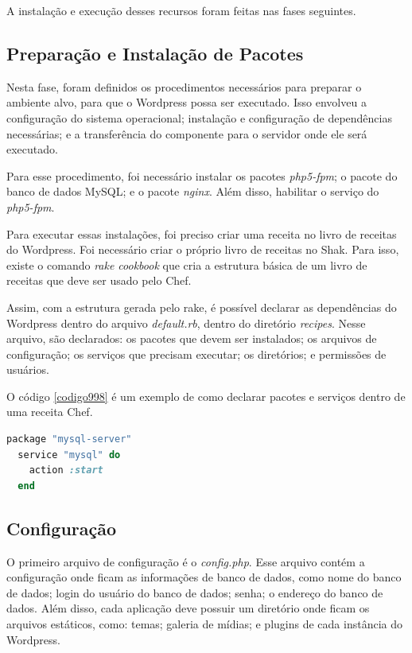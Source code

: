 A instalação e execução desses recursos foram feitas nas fases seguintes.

\subsection{Preparação e Instalação de Pacotes}
\label{wordpress:preparacao}

Nesta fase, foram definidos os procedimentos necessários para 
preparar o ambiente alvo, para que o Wordpress
possa ser executado. Isso envolveu a configuração do sistema operacional; instalação
e configuração de dependências necessárias; e a transferência do componente
para o servidor onde ele será executado.

Para esse procedimento, foi necessário instalar os pacotes \textit{php5-fpm}; o pacote
do banco de dados MySQL; e o pacote \textit{nginx}. Além disso, habilitar o serviço do
\textit{php5-fpm}.
 
Para executar essas instalações, foi preciso criar uma receita no livro de receitas
do Wordpress. Foi necessário criar o próprio livro de receitas no Shak.
Para isso, existe o comando \textit{rake cookbook} que cria a estrutura básica
de um livro de receitas que deve ser usado pelo Chef.

Assim, com a estrutura gerada pelo rake, é possível declarar as dependências do Wordpress
dentro do arquivo \textit{default.rb}, dentro do diretório \textit{recipes}. Nesse 
arquivo, são declarados: os pacotes que devem ser instalados; os arquivos de configuração;
os serviços que precisam executar; os diretórios; e permissões de usuários. 

O código \ref{codigo998} é um exemplo de como declarar pacotes e serviços dentro de uma receita Chef.

\begin{lstlisting}[basicstyle=\ttfamily, language=Ruby,label=dice_index,caption={Exemplo de criação de serviço do mysql com o chef}, label=codigo998]
  package "mysql-server"
  service "mysql" do
    action :start
  end
\end{lstlisting}

\subsection{Configuração}
\label{wordpress:preparacao}

O primeiro arquivo de configuração é o \textit{config.php}. Esse arquivo contém a
configuração onde ficam as informações de banco de dados, como nome do banco de dados;
login do usuário do banco de dados; senha; o endereço do banco de dados. Além disso,
cada aplicação deve possuir um diretório
onde ficam os arquivos estáticos, como: temas; galeria de mídias; e plugins 
de cada instância do Wordpress.

